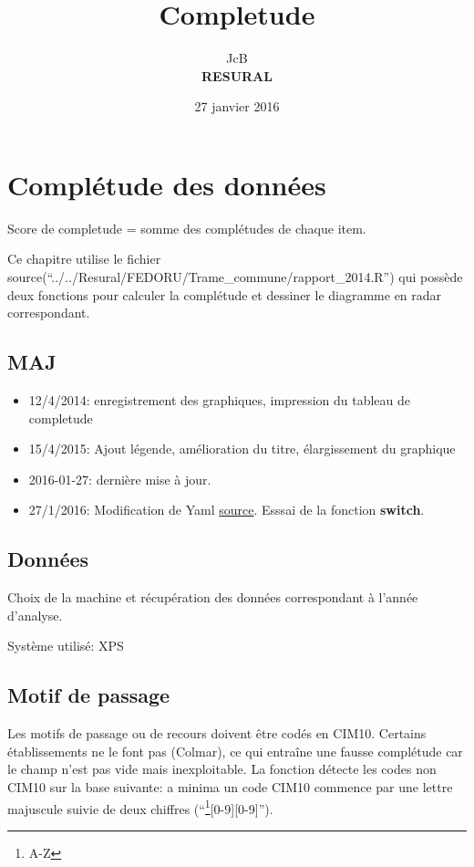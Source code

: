 \documentclass[]{article}
\title{Completude}
\author{JcB \\ \textbf{RESURAL}}
\date{27 janvier 2016}
\let\rmarkdownfootnote\footnote%
\def\footnote{\protect\rmarkdownfootnote}
\begin{document}
\maketitle


{
\hypersetup{linkcolor=black}
\setcounter{tocdepth}{2}
\tableofcontents
}
\section{Complétude des données}\label{completude-des-donnees}

Score de completude = somme des complétudes de chaque item.

Ce chapitre utilise le fichier
source(``../../Resural/FEDORU/Trame\_commune/rapport\_2014.R'') qui
possède deux fonctions pour calculer la complétude et dessiner le
diagramme en radar correspondant.

\subsection{MAJ}\label{maj}

\begin{itemize}
\itemsep1pt\parskip0pt
\item
  12/4/2014: enregistrement des graphiques, impression du tableau de
  completude
\item
  15/4/2015: Ajout légende, amélioration du titre, élargissement du
  graphique
\item
  2016-01-27: dernière mise à jour.
\item
  27/1/2016: Modification de Yaml \href{}{source}. Esssai de la fonction
  \textbf{switch}.
\end{itemize}

\subsection{Données}\label{donnees}

Choix de la machine et récupération des données correspondant à l'année
d'analyse.

Système utilisé: XPS

\subsection{Motif de passage}\label{motif-de-passage}

Les motifs de passage ou de recours doivent être codés en CIM10.
Certains établissements ne le font pas (Colmar), ce qui entraîne une
fausse complétude car le champ n'est pas vide mais inexploitable. La
fonction détecte les codes non CIM10 sur la base suivante: a minima un
code CIM10 commence par une lettre majuscule suivie de deux chiffres
(``\footnote{A-Z}{[}0-9{]}{[}0-9{]}'').
\end{document}
